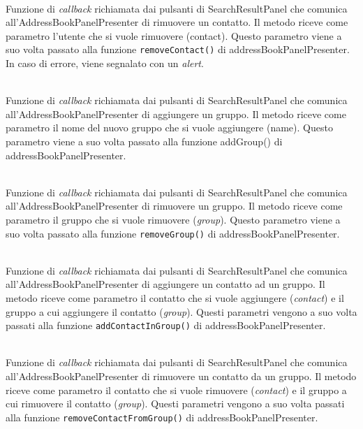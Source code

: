 \begin{description}
\item{}\\
Funzione di \textit{callback} richiamata dai pulsanti di SearchResultPanel che comunica all'AddressBookPanelPresenter di rimuovere un contatto. Il metodo riceve come parametro l'utente che si vuole rimuovere (contact). Questo parametro viene a suo volta passato alla funzione \texttt{removeContact()} di addressBookPanelPresenter. In caso di errore, viene segnalato con un \textit{alert}.

\item{}\\
Funzione di \textit{callback} richiamata dai pulsanti di SearchResultPanel che comunica all'AddressBookPanelPresenter di aggiungere un gruppo. Il metodo riceve come parametro il nome del nuovo gruppo che si vuole aggiungere (name). Questo parametro viene a suo volta passato alla funzione addGroup() di addressBookPanelPresenter.


\item{}\\
Funzione di \textit{callback} richiamata dai pulsanti di SearchResultPanel che comunica all'AddressBookPanelPresenter di rimuovere un gruppo. Il metodo riceve come parametro il gruppo che si vuole rimuovere (\textit{group}). Questo parametro viene a suo volta passato alla funzione \texttt{removeGroup()} di addressBookPanelPresenter.


\item{}\\
Funzione di \textit{callback} richiamata dai pulsanti di SearchResultPanel che comunica all'AddressBookPanelPresenter di aggiungere un contatto ad un gruppo. Il metodo riceve come parametro il contatto che si vuole aggiungere (\textit{contact}) e il gruppo a cui aggiungere il contatto (\textit{group}). Questi parametri vengono a suo volta passati alla funzione \texttt{addContactInGroup()} di addressBookPanelPresenter.


\item{}\\
Funzione di \textit{callback} richiamata dai pulsanti di SearchResultPanel che comunica all'AddressBookPanelPresenter di rimuovere un contatto da un gruppo. Il metodo riceve come parametro il contatto che si vuole rimuovere (\textit{contact}) e il gruppo a cui rimuovere il contatto (\textit{group}). Questi parametri vengono a suo volta passati alla funzione \texttt{removeContactFromGroup()} di addressBookPanelPresenter.



\end{description}
